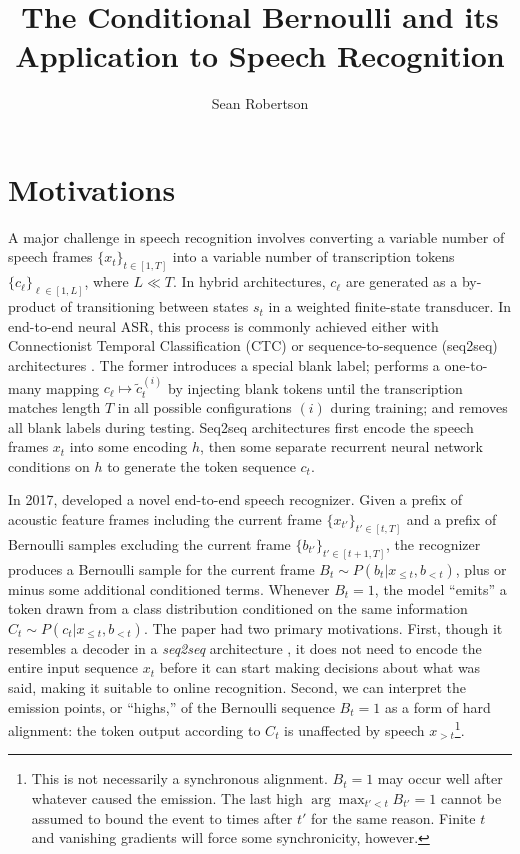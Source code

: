\documentclass{article}
\title{The Conditional Bernoulli and its Application to Speech Recognition}
\author{Sean Robertson}
\begin{document}
\maketitle

\section{Motivations} \label{sec:motivations}

A major challenge in speech recognition involves converting a variable number
of speech frames $\{x_t\}_{t \in [1, T]}$ into a variable number of
transcription tokens $\{c_\ell\}_{\ell \in [1, L]}$, where $L \ll T$. In hybrid
architectures, $c_\ell$ are generated as a by-product of transitioning between
states $s_t$ in a weighted finite-state transducer. In end-to-end neural ASR,
this process is commonly achieved either with Connectionist Temporal
Classification (CTC) \cite{gravesConnectionistTemporalClassification2006} or
sequence-to-sequence (seq2seq) architectures
\cite{bahdanauNeuralMachineTranslation2015}. The former introduces a special
blank label; performs a one-to-many mapping $c_\ell \mapsto \tilde{c}_t^{(i)}$
by injecting blank tokens until the transcription matches length $T$ in all
possible configurations $(i)$ during training; and removes all blank labels
during testing. Seq2seq architectures first encode the speech frames $x_t$ into
some encoding $h$, then some separate recurrent neural network conditions on
$h$ to generate the token sequence $c_t$.

In 2017, \citeauthor{luoLearningOnlineAlignments2017} developed a novel
end-to-end speech recognizer. Given a prefix of acoustic feature frames
including the current frame $\{x_{t'}\}_{t' \in [t, T]}$ and a prefix of
Bernoulli samples excluding the current frame $\{b_{t'}\}_{t' \in [t+1,T]}$,
the recognizer produces a Bernoulli sample for the current frame $B_t \sim
P(b_t|x_{\leq t}, b_{<t})$, plus or minus some additional conditioned terms.
Whenever $B_t = 1$, the model ``emits'' a token drawn from a class distribution
conditioned on the same information $C_t \sim P(c_t|x_{\leq t}, b_{<t})$. The
paper had two primary motivations. First, though it resembles a decoder in a
\textit{seq2seq} architecture \cite{bahdanauNeuralMachineTranslation2015}, it
does not need to encode the entire input sequence $x_t$ before it can start
making decisions about what was said, making it suitable to online recognition.
Second, we can interpret the emission points, or ``highs,'' of the Bernoulli
sequence $B_t = 1$ as a form of hard alignment: the token output according to
$C_t$ is unaffected by speech $x_{>t}$\footnote{
%
    This is not necessarily a synchronous alignment. $B_t = 1$ may occur well
    after whatever caused the emission. The last high $\arg\max_{t' < t} B_{t'}
    = 1$ cannot be assumed to bound the event to times after $t'$ for the same
    reason. Finite $t$ and vanishing gradients will force some synchronicity,
    however.
%
}.
\end{document}
